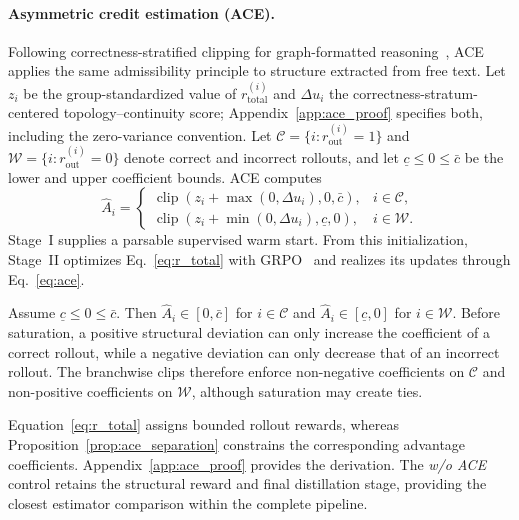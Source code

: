 \paragraph{Asymmetric credit estimation (ACE).}
Following correctness-stratified clipping for graph-formatted reasoning~\citep{liu2026graph}, ACE applies the same admissibility principle to structure extracted from free text. Let $z_i$ be the group-standardized value of $r_{\mathrm{total}}^{(i)}$ and $\Delta u_i$ the correctness-stratum-centered topology--continuity score; Appendix~\ref{app:ace_proof} specifies both, including the zero-variance convention. Let $\mathcal C=\{i:r_{\mathrm{out}}^{(i)}=1\}$ and $\mathcal W=\{i:r_{\mathrm{out}}^{(i)}=0\}$ denote correct and incorrect rollouts, and let $\underline c\leq0\leq\bar c$ be the lower and upper coefficient bounds. ACE computes
\begin{equation}
\label{eq:ace}
\widehat A_i=
\begin{cases}
\operatorname{clip}\!\left(z_i+\max(0,\Delta u_i),0,\bar c\right), & i\in\mathcal C,\\
\operatorname{clip}\!\left(z_i+\min(0,\Delta u_i),\underline c,0\right), & i\in\mathcal W.
\end{cases}
\end{equation}
Stage~I supplies a parsable supervised warm start. From this initialization, Stage~II optimizes Eq.~\ref{eq:r_total} with GRPO~\citep{shao2024deepseekmath} and realizes its updates through Eq.~\ref{eq:ace}.

\begin{proposition}
\label{prop:ace_separation}
Assume $\underline c\leq0\leq\bar c$. Then $\widehat A_i\in[0,\bar c]$ for $i\in\mathcal C$ and $\widehat A_i\in[\underline c,0]$ for $i\in\mathcal W$. Before saturation, a positive structural deviation can only increase the coefficient of a correct rollout, while a negative deviation can only decrease that of an incorrect rollout. The branchwise clips therefore enforce non-negative coefficients on $\mathcal C$ and non-positive coefficients on $\mathcal W$, although saturation may create ties.
\end{proposition}

Equation~\ref{eq:r_total} assigns bounded rollout rewards, whereas Proposition~\ref{prop:ace_separation} constrains the corresponding advantage coefficients. Appendix~\ref{app:ace_proof} provides the derivation. The \emph{w/o ACE} control retains the structural reward and final distillation stage, providing the closest estimator comparison within the complete pipeline.


